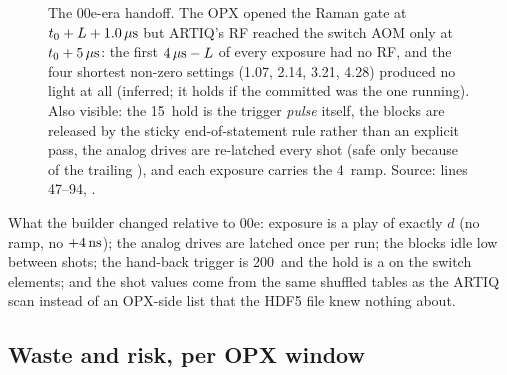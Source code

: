 \begin{figure}[htbp]
\caption{The 00e-era handoff. The OPX opened the Raman gate at $t_0 + L +
1.0\,\mu\mathrm{s}$ but ARTIQ's RF reached the switch AOM only at $t_0 + 5\,\mu\mathrm{s}$: the first
$4\,\mu\mathrm{s} - L$ of every exposure had no RF, and the four shortest non-zero
settings (1.07, 2.14, 3.21, 4.28\us) produced no light at all (inferred; it
holds if the committed  was the one running). Also visible:
the 15\us\ hold is the trigger \emph{pulse} itself, the blocks are released by
the sticky end-of-statement rule rather than an explicit pass, the analog
drives are re-latched every shot (safe only because of the trailing
), and each exposure carries the 4\nsu\ ramp. Source:
 lines 47--94, .}
\label{fig:timing_b}
\end{figure}

What the builder changed relative to 00e: exposure is a  play of
exactly $d$ (no ramp, no $+4\,\mathrm{ns}$); the analog drives are latched once per
run; the blocks idle low between shots; the hand-back trigger is 200\nsu\
and the hold is a  on the switch elements; and the shot values
come from the same shuffled tables as the ARTIQ scan instead of an OPX-side
list that the HDF5 file knew nothing about.

\subsection{Waste and risk, per OPX window}
\label{sec:handoff:waste}

